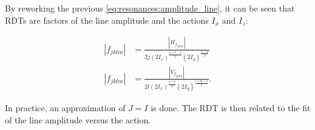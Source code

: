 
By reworking the previous \cref{eq:resonances:amplitude_line}, it can be seen that RDTs are factors
of the line amplitude and the actions $I_x$ and $I_z$:

\begin{equation}
    \begin{aligned}
    |f_{jklm}| &= \frac{|H_{f_{jklm}}|}{2 j (2 I_x)^\frac{j+k-1}{2} (2 I_y)^\frac{l+m}{2}} \\
    |f_{jklm}| &= \frac{|V_{f_{jklm}}|}{2 l (2 I_x)^\frac{j+k}{2} (2 I_y)^\frac{l+m-1}{2}} .
    \label{eq:resonances:amplitude_rdt}
    \end{aligned}
\end{equation}

In practice, an approximation of $J = I$ is done. The RDT is then related to the fit of the line
amplitude versus the action.%

